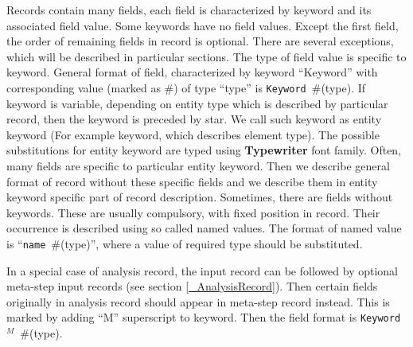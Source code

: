 \documentclass[a4paper]{article}
\newcommand{\param}[1]{\texttt{#1}} %
\newcommand{\field}[2]{\param{#1}~\#{\tiny(#2)}} %
\newcommand{\entKeywordInst}[1]{\textbf{#1}} %
\begin{document}
Records contain many fields, each field is characterized by
keyword and its associated  field value. Some keywords have no field  values.
Except the first field, the order of remaining fields in record is
optional. There are several
exceptions, which will be described in particular sections.
The type of field value is specific to  keyword.
General format of field, characterized by keyword ``Keyword'' with
corresponding value (marked as \#) of type ``type'' is
\field{Keyword}{type}.
If keyword is variable, depending on entity type which is
described by particular record, then the keyword is preceded by star. We call such keyword
as entity keyword (For example keyword, which  describes  element
type). The possible
substitutions for entity keyword are typed using
\entKeywordInst{Typewriter} font family.
Often, many fields are specific to particular entity keyword. Then we describe
general format of record without these specific fields and we describe
them in entity keyword specific part of record description.
Sometimes, there are fields without keywords. These are usually
compulsory, with fixed position in record. Their occurrence is
described using so called named values. The format of named value is
``\field{name}{type}'', where a value of required type should be
substituted.

In a special case of analysis record, the input record can be followed
by optional meta-step input records (see section
\ref{_AnalysisRecord}). Then certain fields originally in analysis
record should appear in meta-step record instead. This is marked by
adding ``M'' superscript to keyword. Then the field format is \field{Keyword$^M$}{type}.
\end{document}
